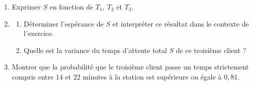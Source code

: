 \documentclass[10pt]{article}
\begin{document}
\medskip

\begin{enumerate}
\item Exprimer $S$ en fonction de $T_1,\: T_2$ et $T_3$.
\item 
	\begin{enumerate}
		\item Déterminer l'espérance de $S$ et interpréter ce résultat dans le contexte de l'exercice. 
		\item Quelle est la variance du temps d'attente total $S$ de ce troisième client ?
	\end{enumerate}
\item Montrer que la probabilité que le troisième client passe un temps strictement compris entre $14$ et $22$ minutes à la station est supérieure ou égale à $0,81$.
\end{enumerate}

\bigskip
\end{document}
